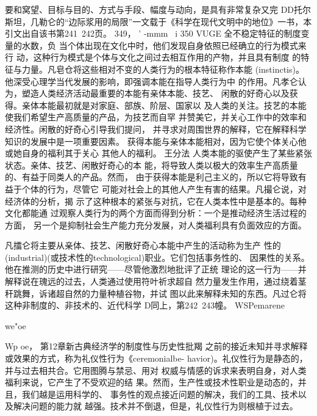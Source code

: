 要和窝望、目标与目的、方式与手段、幅度与动向，是具有非常复杂又完
DD托尔斯坦，几勒仑的“边际浆用的局限”一文载于《科学在现代文明中的地位》一书，本
引文出自该书第241~242页。
349，
'
-mmm~
i
350
VUGE
全不稳定特征的制度变量的水数，负
当个体出现在文化中时，他们发现自身依照已经确立的行为模式来行
动，这种行为模式是个体与文化之间过去相互作用的产物，并且具有制度
的特征与力量。凡皂仓将这些相对不变的人类行为的根本特征称作本能
(instinctis)。他深受心理学当代发展的影响，即强调本能在指导人类行为中
的作用。凡孝仑认为，塑造人类经济活动最重要的本能有亲体本能、技艺、
闲散的好奇心以及获得。亲体本能最初就是对家庭、部族、阶层、国家以
及人类的关注。技艺的本能使我们希望生产高质量的产品，为技艺而自罕
并赞美它，并关心工作中的效率和经济性。闲散的好奇心引导我们提问，
并寻求对周围世界的解释，它在解释科学知识的发展中是一项重要因素。
获得本能与亲体本能相对，因为它使个体关心他或她自身的福利其于关心
其他人的福利。
王分法
人类本能的驱使产生了某些紧张状态。亲体、技艺、闲散好奇心的本
能，将导致人类以极大的效率生产高质量的、有益于同类人的产品。然而，
由于获得本能是利己主义的，所以它将导致有益于个体的行为，尽管它
可能对社会上的其他人产生有害的结果。凡撮仑说，对经济体的分析，揭
示了这种根本的紧张与对抗，它在人类本性中是基本的。每种文化都能通
过观察人类行为的两个方面而得到分析：一个是推动经济生活过程的方面，
另一个是抑制社会生产能力充分发展，对人类福利具有负面效应的方面。

凡擂仑将主要从亲体、技艺、闲散好奇心本能中产生的活动称为生产
性的(industrial)(或技术性的technological)职业。它们包括事务性的、
因果性的关系。他在推测的历史中进行研究——尽管他激烈地批评了正统
理论的这一行为——并解释说在瑰远的过去，人类通过使用符叶祈求超自
然力量发生作用，通过绕着茎秆跳舞，诉诸超自然的力量种植谷物，并试
图以此来解释未知的东西。凡过仑将这种非制度的、非技术的、近代科学
D同上，第242~243幢。
WSPemarene

we"oe

Wp
oe，
第12章新古典经济学的制度性与历史性批羯
之前的接近未知并寻求解释或效果的方式，称为礼仪性行为《ceremonialbe-
havior)。礼仪性行为是静态的，并与过去相共合。它用图腾与禁忌、用对
权威与情感的诉求来表明自身，对人类福利来说，它产生了不受欢迎的结
果。然而，生产性或技术性职业是动态的，并且，我们越是运用科学的、
事务性的观点接近问题的解决，我们的工具、技术以及解决问题的能力就
越强。技术并不倒退，但是，礼仪性行为则根植于过去。

